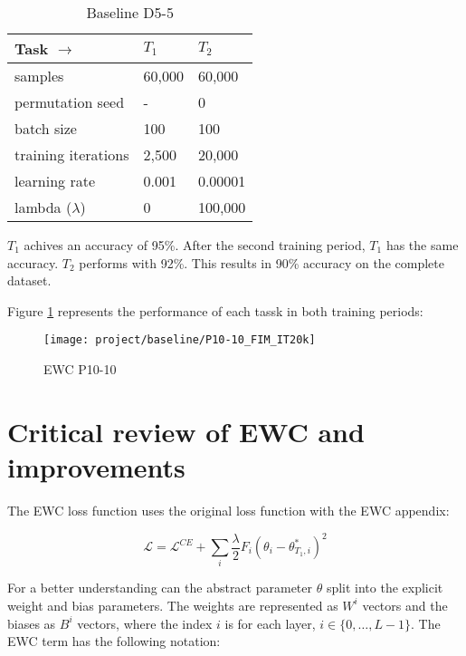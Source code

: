 \begin{table}[H]
    \centering
    \begin{tabular}{ |l|l|l| }
        \hline
        Task $\to$ & $T_1$ & $T_2$ \\
        \hline\hline
        samples & 60,000 & 60,000 \\
        \hline
        permutation seed & - & 0 \\
        \hline
        batch size & 100 & 100 \\
        \hline
        training iterations & 2,500 & 20,000 \\
        \hline
        learning rate & 0.001 & 0.00001 \\
        \hline
        lambda ($\lambda$) & 0 & 100,000 \\
        \hline
    \end{tabular}
    \caption{Baseline D5-5}
    \label{table:base_d55}
\end{table}

$T_1$ achives an accuracy of 95\%.
After the second training period, $T_1$ has the same accuracy.
$T_2$ performs with 92\%.
This results in 90\% accuracy on the complete dataset.

Figure \ref{fig:ewc_p10-10} represents the performance of each tassk in both training periods:

\begin{figure}[H]
    \centering
    \texttt{[image: project/baseline/P10-10\_FIM\_IT20k]}
    \caption{EWC P10-10}
    \label{fig:ewc_p10-10}
\end{figure}

\newpage

\section{Critical review of EWC and improvements}
\label{project_review_improvements}

The EWC loss function uses the original loss function with the EWC appendix:

\begin{equation}
    \mathcal{L} = 
    \mathcal{L}^{CE} 
    + \sum_{i} 
        \frac{\lambda}{2} 
        F_{i} 
        (\theta_{i} - \theta_{T_1,i}^{*})^2
\end{equation}

For a better understanding can the abstract parameter $\theta$ split into the explicit weight and bias parameters.
The weights are represented as $W^i$ vectors and the biases as $B^i$ vectors, where the index $i$ is for each layer, $i \in \{ 0, \dots, L-1 \}$.
The EWC term has the following notation:

